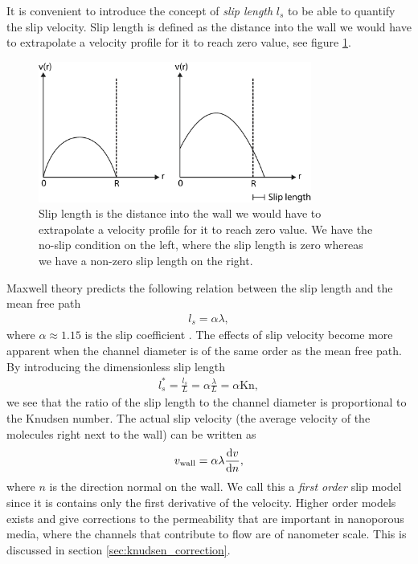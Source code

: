It is convenient to introduce the concept of \textit{slip length} $l_s$ to be able to quantify the slip velocity. Slip length is defined as the distance into the wall we would have to extrapolate a velocity profile for it to reach zero value, see figure \ref{fig:slip_length}.
\begin{figure}[h!]
\begin{center}
\includegraphics[width=0.8\textwidth, trim=0cm 0cm 0cm 0cm, clip]{DSMC/figures/slip_length.eps}
\end{center}
\caption{Slip length is the distance into the wall we would have to extrapolate a velocity profile for it to reach zero value. We have the no-slip condition on the left, where the slip length is zero whereas we have a non-zero slip length on the right.}
\label{fig:slip_length}
\end{figure}
Maxwell theory predicts the following relation between the slip length and the mean free path
\begin{align}
	\label{eq:noslip_sliplength}
	l_s = \alpha \lambda,
\end{align}
where $\alpha\approx 1.15$ is the slip coefficient \cite{morris1992slip}. The effects of slip velocity become more apparent when the channel diameter is of the same order as the mean free path. By introducing the dimensionless slip length
\begin{align}
	l_s^* = \frac{l_s}{ L} = \alpha \frac{\lambda }{ L} = \alpha \text{Kn},
\end{align}
we see that the ratio of the slip length to the channel diameter is proportional to the Knudsen number. The actual slip velocity (the average velocity of the molecules right next to the wall) can be written as
\begin{align}
	\label{eq:linear_slip_velocity}
	v_{\text{wall}} = \alpha\lambda\frac{\mathrm{d}v}{\mathrm{d}n},
\end{align}
where $n$ is the direction normal on the wall\cite{klinkenberg1941permeability}. We call this a \textit{first order} slip model since it is contains only the first derivative of the velocity. Higher order models exists and give corrections to the permeability that are important in nanoporous media, where the channels that contribute to flow are of nanometer scale. This is discussed in section \ref{sec:knudsen_correction}.


